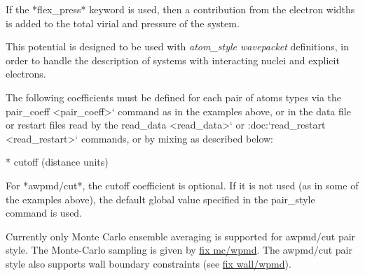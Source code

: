 \documentclass[a4paper,12pt]{article}
\begin{document}
If the *flex\_press* keyword is used, then a contribution from the
electron widths is added to the total virial and pressure of the system.

This potential is designed to be used with \textsl{atom\_style wavepacket} definitions, in order to handle the
description of systems with interacting nuclei and explicit electrons.

The following coefficients must be defined for each pair of atoms
types via the pair\_coeff <pair\_coeff>` command as in the examples
above, or in the data file or restart files read by the
read\_data <read\_data>` or :doc:`read\_restart <read\_restart>`
commands, or by mixing as described below:

* cutoff (distance units)

For *awpmd/cut*, the cutoff coefficient is optional.  If it is not
used (as in some of the examples above), the default global value
specified in the pair\_style command is used.


Currently only Monte Carlo ensemble averaging is supported for awpmd/cut pair style. The Monte-Carlo sampling is given by \href{fix_mc_wpmd.html}{fix mc/wpmd}. The awpmd/cut pair style also supports wall boundary constraints (see \href{fix_wall_wpmd.html}{fix wall/wpmd}).
\end{document}

